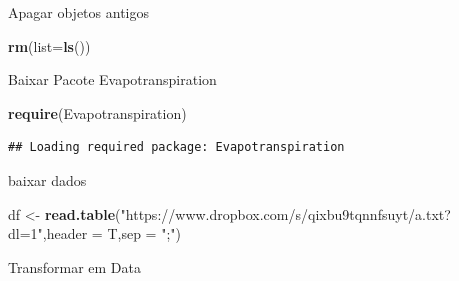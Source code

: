 \documentclass[
]{book}
\newenvironment{Shaded}{\begin{snugshade}}{\end{snugshade}}
\newcommand{\DataTypeTok}[1]{\textcolor[rgb]{0.13,0.29,0.53}{#1}}
\newcommand{\DecValTok}[1]{\textcolor[rgb]{0.00,0.00,0.81}{#1}}
\newcommand{\KeywordTok}[1]{\textcolor[rgb]{0.13,0.29,0.53}{\textbf{#1}}}
\newcommand{\NormalTok}[1]{#1}
\newcommand{\OperatorTok}[1]{\textcolor[rgb]{0.81,0.36,0.00}{\textbf{#1}}}
\newcommand{\StringTok}[1]{\textcolor[rgb]{0.31,0.60,0.02}{#1}}
\begin{document}
Apagar objetos antigos

\begin{Shaded}
\begin{Highlighting}[]
\KeywordTok{rm}\NormalTok{(}\DataTypeTok{list=}\KeywordTok{ls}\NormalTok{())}
\end{Highlighting}
\end{Shaded}

Baixar Pacote Evapotranspiration

\begin{Shaded}
\begin{Highlighting}[]
\KeywordTok{require}\NormalTok{(Evapotranspiration)}
\end{Highlighting}
\end{Shaded}

\begin{verbatim}
## Loading required package: Evapotranspiration
\end{verbatim}

baixar dados

\begin{Shaded}
\begin{Highlighting}[]
\NormalTok{df <-}\StringTok{ }\KeywordTok{read.table}\NormalTok{(}\StringTok{"https://www.dropbox.com/s/qixbu9tqnnfsuyt/a.txt?dl=1"}\NormalTok{,}\DataTypeTok{header =}\NormalTok{ T,}\DataTypeTok{sep =} \StringTok{";"}\NormalTok{)}
\end{Highlighting}
\end{Shaded}

Transformar em Data

\begin{Shaded}
\end{Shaded}
\end{document}
